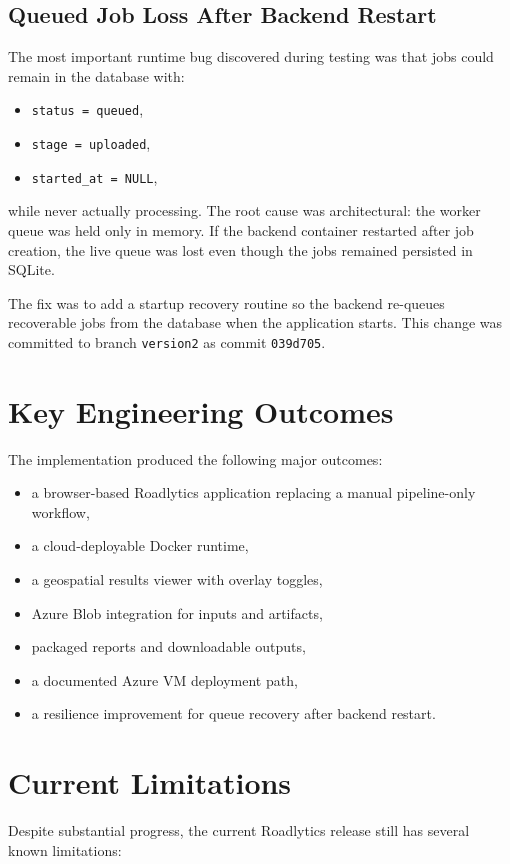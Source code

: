 \documentclass[conference]{IEEEtran}
\begin{document}
\subsection{Queued Job Loss After Backend Restart}
The most important runtime bug discovered during testing was that jobs could
remain in the database with:

\begin{itemize}[leftmargin=16pt]
\item \texttt{status = queued},
\item \texttt{stage = uploaded},
\item \texttt{started\_at = NULL},
\end{itemize}

while never actually processing. The root cause was architectural: the worker
queue was held only in memory. If the backend container restarted after job
creation, the live queue was lost even though the jobs remained persisted in
SQLite.

The fix was to add a startup recovery routine so the backend re-queues
recoverable jobs from the database when the application starts. This change was
committed to branch \texttt{version2} as commit \texttt{039d705}.

\section{Key Engineering Outcomes}
The implementation produced the following major outcomes:

\begin{itemize}[leftmargin=16pt]
\item a browser-based Roadlytics application replacing a manual pipeline-only
workflow,
\item a cloud-deployable Docker runtime,
\item a geospatial results viewer with overlay toggles,
\item Azure Blob integration for inputs and artifacts,
\item packaged reports and downloadable outputs,
\item a documented Azure VM deployment path,
\item a resilience improvement for queue recovery after backend restart.
\end{itemize}

\section{Current Limitations}
Despite substantial progress, the current Roadlytics release still has several
known limitations:
\end{document}
